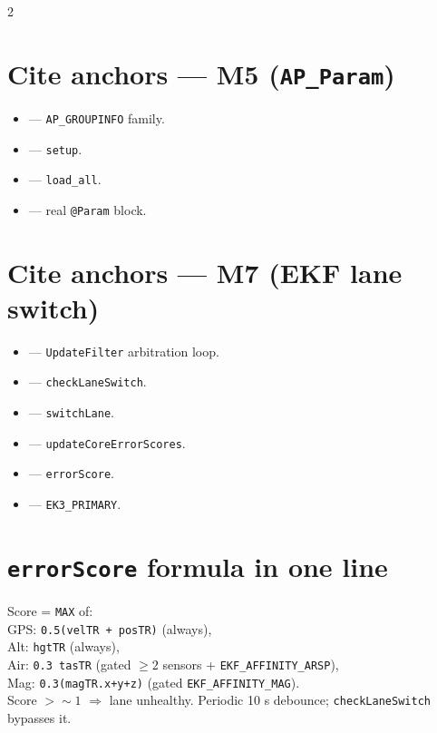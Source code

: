\begin{multicols}{2}
\section*{Cite anchors --- M5 (\texttt{AP\_Param})}
\begin{itemize}\footnotesize
  \item {} --- \texttt{AP\_GROUPINFO} family.
  \item {} --- \texttt{setup}.
  \item {} --- \texttt{load\_all}.
  \item {} --- real \texttt{@Param} block.
\end{itemize}

\section*{Cite anchors --- M7 (EKF lane switch)}
\begin{itemize}\footnotesize
  \item {} --- \texttt{UpdateFilter} arbitration loop.
  \item {} --- \texttt{checkLaneSwitch}.
  \item {} --- \texttt{switchLane}.
  \item {} --- \texttt{updateCoreErrorScores}.
  \item {} --- \texttt{errorScore}.
  \item {} --- \texttt{EK3\_PRIMARY}.
\end{itemize}

\section*{\texttt{errorScore} formula in one line}
\footnotesize
Score = \texttt{MAX} of:\\
\quad GPS: \texttt{0.5(velTR + posTR)} (always),\\
\quad Alt: \texttt{hgtTR} (always),\\
\quad Air: \texttt{0.3 tasTR} (gated $\geq 2$ sensors + \texttt{EKF\_AFFINITY\_ARSP}),\\
\quad Mag: \texttt{0.3(magTR.x+y+z)} (gated \texttt{EKF\_AFFINITY\_MAG}).\\
Score $> \sim 1$ $\Rightarrow$ lane unhealthy. Periodic 10 s debounce; \texttt{checkLaneSwitch} bypasses it.


\end{multicols}
